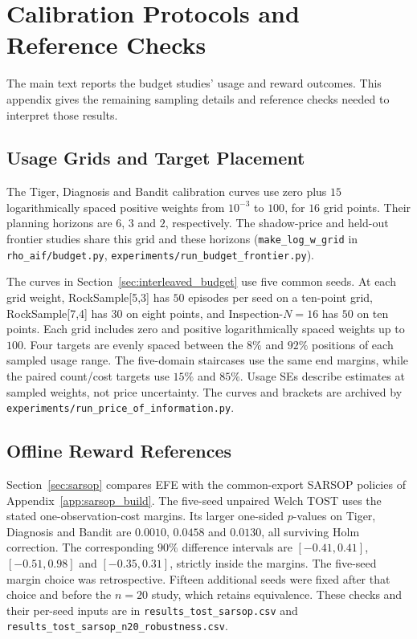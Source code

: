 \documentclass[manuscript, screen, review]{jair}
\begin{document}
\FloatBarrier
\section{Calibration Protocols and Reference Checks}
\label{app:extended_budget_evidence}

The main text reports the budget studies' usage and reward outcomes. This appendix gives the remaining sampling details and reference checks needed to interpret those results.

\subsection{Usage Grids and Target Placement}
\label{app:interleaved_details}

The Tiger, Diagnosis and Bandit calibration curves use zero plus $15$ logarithmically spaced positive weights from $10^{-3}$ to $100$, for $16$ grid points. Their planning horizons are $6$, $3$ and $2$, respectively. The shadow-price and held-out frontier studies share this grid and these horizons (\texttt{make\_\allowbreak log\_\allowbreak w\_\allowbreak grid} in \texttt{rho\_\allowbreak aif/\allowbreak budget.py}, \texttt{experiments/\allowbreak run\_\allowbreak budget\_\allowbreak frontier.py}).

The curves in Section~\ref{sec:interleaved_budget} use five common seeds. At each grid weight, RockSample[5,3] has $50$ episodes per seed on a ten-point grid, RockSample[7,4] has $30$ on eight points, and Inspection-$N=16$ has $50$ on ten points. Each grid includes zero and positive logarithmically spaced weights up to $100$. Four targets are evenly spaced between the $8\%$ and $92\%$ positions of each sampled usage range. The five-domain staircases use the same end margins, while the paired count/cost targets use $15\%$ and $85\%$. Usage SEs describe estimates at sampled weights, not price uncertainty. The curves and brackets are archived by \texttt{experiments/\allowbreak run\_\allowbreak price\_\allowbreak of\_\allowbreak information.py}.

\subsection{Offline Reward References}
\label{app:sarsop_details}
\label{app:cpomdp_details}

Section~\ref{sec:sarsop} compares EFE with the common-export SARSOP policies of Appendix~\ref{app:sarsop_build}. The five-seed unpaired Welch TOST uses the stated one-observation-cost margins. Its larger one-sided $p$-values on Tiger, Diagnosis and Bandit are $0.0010$, $0.0458$ and $0.0130$, all surviving Holm correction. The corresponding $90\%$ difference intervals are $[-0.41,0.41]$, $[-0.51,0.98]$ and $[-0.35,0.31]$, strictly inside the margins. The five-seed margin choice was retrospective. Fifteen additional seeds were fixed after that choice and before the $n=20$ study, which retains equivalence. These checks and their per-seed inputs are in \texttt{results\_\allowbreak tost\_\allowbreak sarsop.csv} and \texttt{results\_\allowbreak tost\_\allowbreak sarsop\_\allowbreak n20\_\allowbreak robustness.csv}.
\end{document}
